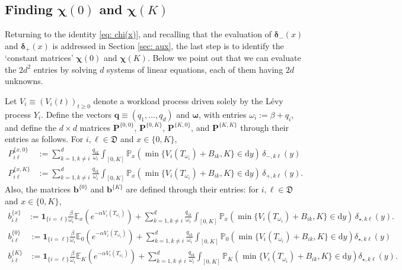 \documentclass[reqno,12pt]{amsart}
\newcommand{\bs}{\boldsymbol}
\newcommand{\defD}{{\mathfrak D}}
\begin{document}
    
\subsection{Finding \texorpdfstring{${\bs \chi}(0)$}{chi 0} and \texorpdfstring{${\bs \chi}(K)$}{chi K}}\label{sec: chi(0) and chi(K)}
Returning to the identity \eqref{eq: chi(x)}, and recalling that the evaluation of ${\bs \delta}_-(x)$ and ${\bs \delta}_+(x)$ is addressed in Section \ref{sec: aux},
the last step is to identify the `constant matrices' $\bs\chi(0)$ and $\bs\chi(K)$.  Below we point out that  we can evaluate the $2d^2$ entries by solving $d$ systems of linear equations, each of them having $2d$ unknowns. 

\medskip

Let $V_i \equiv (V_i(t))_{t\geqslant 0}$ denote a workload process driven solely by the Lévy process $Y_i$. Define the vectors $\bs{q} \equiv (q_1,\dots,q_d)$ and $\bs{\omega}$, with entries $\omega_i := \beta + q_i$, and define the $d\times d$ matrices $\bs{P}^{\{0,0\}}$, $\bs{P}^{\{0,K\}}$, $\bs{P}^{\{K,0\}}$, and $\bs{P}^{\{K,K\}}$ through their entries as follows. For $i,\ell \in \defD $ and $x\in\{0,K\}$,
\begin{align*}
    P_{i\ell}^{\{x,0\}} &:= \sum_{k=1,k\neq i}^d \frac{q_{ik}}{\omega_i}\int_{[0,K]}\mathbb{P}_x\left(\min\{V_i(T_{\omega_i}) + B_{ik}, K\}\in\mathrm{d}y\right)\,\delta_{-,k\ell}(y) \\
    P_{i\ell}^{\{x,K\}} &:= \sum_{k=1,k\neq i}^d \frac{q_{ik}}{\omega_i}\int_{[0,K]}\mathbb{P}_x\left(\min\{V_i(T_{\omega_i}) + B_{ik}, K\}\in\mathrm{d}y\right)\,\delta_{+,k\ell}(y) .
\end{align*}
Also, the matrices ${\bs b}^{\{0\}}$ and ${\bs b}^{\{K\}}$ are defined through their entries: for $i,\ell \in \defD $ and $x\in\{0,K\}$,
\begin{align*}
    {b}^{\{x\}}_{i\ell} &:= \bs{1}_{\{i=\ell\}}\frac{\beta}{\omega_i}\mathbb{E}_x\left(e^{-\alpha V_i(T_{\omega_i})}\right) + \sum_{k=1, k\neq i}^d \frac{q_{ik}}{\omega_i}\int_{[0,K]}\mathbb{P}_x\left(\min\{V_i(T_{\omega_i}) + B_{ik}, K\}\in\mathrm{d}y\right)\,\delta_{\star,k\ell}(y).
\end{align*}
\iffalse
\begin{align*}
    {b}^{\{0\}}_{i\ell} &:= \bs{1}_{\{i=\ell\}}\frac{\beta}{\omega_i}\mathbb{E}_0\left(e^{-\alpha V_i(T_{\omega_i})}\right) + \sum_{k=1, k\neq i}^d \frac{q_{ik}}{\omega_i}\int_{[0,K]}\mathbb{P}_0\left(\min\{V_i(T_{\omega_i}) + B_{ik}, K\}\in\mathrm{d}y\right)\delta_{\star,k\ell}(y) \\
    {b}^{\{K\}}_{i\ell} &:= \bs{1}_{\{i=\ell\}}\frac{\beta}{\omega_i}\mathbb{E}_K\left(e^{-\alpha V_i(T_{\omega_i})}\right) + \sum_{k=1, k\neq i}^d \frac{q_{ik}}{\omega_i}\int_{[0,K]}\mathbb{P}_K\left(\min\{V_i(T_{\omega_i}) + B_{ik}, K\}\in\mathrm{d}y\right)\delta_{\star,k\ell}(y).
\end{align*}
\end{document}
